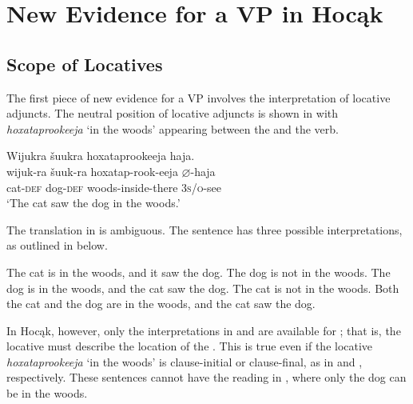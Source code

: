 \documentclass[output=paper]{LSP/langsci}
\begin{document}
\section{New Evidence for a VP in Hocąk}\label{sec:jrs:4}

\subsection{Scope of Locatives}

The first piece of new evidence for a VP involves the interpretation of locative adjuncts. The neutral position of locative adjuncts is shown in  with \textit{hoxataprookeeja} `in the woods' appearing between the  and the verb.

\begin{exe}
\ex\label{ex:jrs:37} 
\glll Wijukra	\v{s}uukra		hoxataprookeeja		haja.\\
wijuk-ra	\v{s}uuk-ra		hoxatap-rook-eeja		$\varnothing$-haja \\
cat-\textsc{def}		dog-\textsc{def} 	woods-inside-there	\textsc{3s/o}-see \\
\trans `The cat saw the dog in the woods.' 
\end{exe}

The translation in  is ambiguous. The  sentence has three possible interpretations, as outlined in  below.

\begin{exe}
\ex\label{ex:jrs:38} 
\begin{xlist}
\ex \label{ex:jrs:38a} The cat is in the woods, and it saw the dog. The dog is not in the woods. 
\ex \label{ex:jrs:38b} The dog is in the woods, and the cat saw the dog. The cat is not in the woods.
\ex \label{ex:jrs:38c}Both the cat and the dog are in the woods, and the cat saw the dog.
\end{xlist}
\end{exe}

In Hocąk, however, only the interpretations in  and  are available for ; that is, the locative  must describe the location of the . This is true even if the locative \textit{hoxataprookeeja} `in the woods' is clause-initial or clause-final, as in  and  , respectively. These sentences cannot have the reading in , where only the dog can be in the woods.
\end{document}
